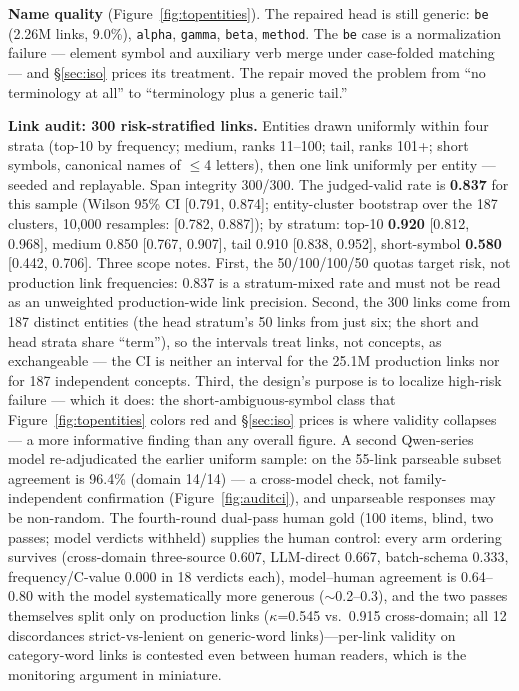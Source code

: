 \documentclass[sigconf,nonacm,anonymous]{acmart}
\begin{document}
\textbf{Name quality} (Figure~\ref{fig:topentities}). The repaired head
is still generic: \texttt{be} (2.26M links, 9.0\%), \texttt{alpha},
\texttt{gamma}, \texttt{beta}, \texttt{method}. The \texttt{be} case is
a normalization failure --- element symbol and auxiliary verb merge
under case-folded matching --- and \S\ref{sec:iso} prices its
treatment. The repair moved the problem from ``no terminology at all''
to ``terminology plus a generic tail.''

\textbf{Link audit: 300 risk-stratified links.} Entities drawn
uniformly within four strata (top-10 by frequency; medium, ranks 11--100;
tail, ranks 101+; short symbols, canonical names of $\leq$4 letters),
then one link uniformly per entity --- seeded and replayable. Span
integrity 300/300. The judged-valid rate is \textbf{0.837} for this
sample (Wilson 95\% CI [0.791, 0.874]; entity-cluster bootstrap over
the 187 clusters, 10{,}000 resamples: [0.782, 0.887]); by stratum: top-10
\textbf{0.920} [0.812, 0.968], medium 0.850 [0.767, 0.907], tail
0.910 [0.838, 0.952], short-symbol \textbf{0.580} [0.442, 0.706].
Three scope notes. First, the 50/100/100/50 quotas target risk, not
production link frequencies: 0.837 is a stratum-mixed rate and must not
be read as an unweighted production-wide link precision. Second, the
300 links come from 187 distinct entities (the head stratum's 50 links
from just six; the short and head strata share ``term''), so the
intervals treat links, not concepts, as exchangeable --- the CI is
neither an interval for the 25.1M production links nor for 187
independent concepts. Third, the
design's purpose is to localize high-risk failure --- which it does:
the short-ambiguous-symbol class that Figure~\ref{fig:topentities}
colors red and \S\ref{sec:iso} prices is where validity collapses ---
a more informative finding than any overall figure. A second
Qwen-series model re-adjudicated the earlier uniform sample: on the
55-link parseable subset agreement is 96.4\% (domain 14/14) --- a
cross-model check, not family-independent confirmation
(Figure~\ref{fig:auditci}), and unparseable responses may be
non-random. The fourth-round dual-pass human gold (100 items, blind,
two passes; model verdicts withheld) supplies the human control:
every arm ordering survives (cross-domain three-source 0.607,
LLM-direct 0.667, batch-schema 0.333, frequency/C-value 0.000 in 18
verdicts each), model--human agreement is 0.64--0.80 with the model
systematically more generous (${\sim}$0.2--0.3), and the two passes
themselves split only on production links ($\kappa$=0.545 vs.\ 0.915
cross-domain; all 12 discordances strict-vs-lenient on generic-word
links)---per-link validity on category-word links is contested even
between human readers, which is the monitoring argument in miniature.
\end{document}
